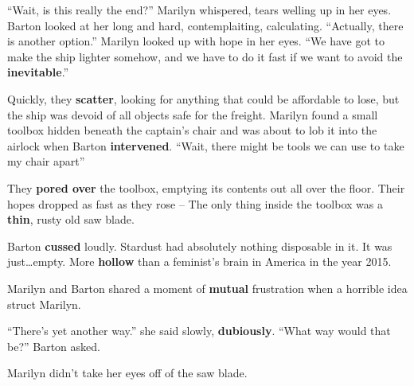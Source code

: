 ``Wait, is this  really  the  end?''  Marilyn whispered, tears welling up in her
eyes.  Barton  looked  at  her  long  and  hard, contemplaiting, calculating.
``Actually, there is  another option.'' Marilyn looked up with hope in her eyes.
``We have got to make the ship lighter somehow, and we have  to do it fast if we
want to avoid the \textbf{inevitable}.''

Quickly, they \textbf{scatter}, looking for anything that could be affordable to
lose, but the ship was devoid of all objects safe for the freight. Marilyn found
a  small toolbox hidden beneath the captain's chair and was about to lob it into
the airlock when Barton \textbf{intervened}.
``Wait,   there   might   be  tools  we  can  use  to  take  my  chair   apart''

They \textbf{pored over} the  toolbox,  emptying  its  contents out all over the
floor. Their hopes dropped as  fast  as  they  rose -- The only thing inside the
toolbox was a \textbf{thin}, rusty old saw blade.

Barton \textbf{cussed} loudly. Stardust had absolutely nothing disposable in it.
It was just\ldots empty. More \textbf{hollow} than a feminist's brain in America
in the year 2015.

Marilyn  and  Barton  shared  a moment of  \textbf{mutual}  frustration  when  a
horrible idea struct Marilyn.

``There's yet another way.'' she said slowly, \textbf{dubiously}.
``What way would that be?'' Barton asked.

Marilyn didn't take her eyes off of the saw blade. 
